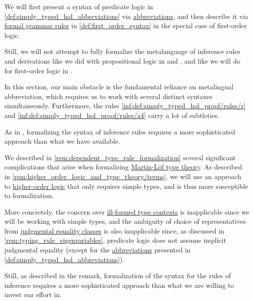 \begin{remark}\label{rem:predicate_logic_formalization}
  We will first present a syntax of predicate logic in \cref{def:simply_typed_hol_abbreviations} via \hyperref[con:metalingual_abbreviation]{abbreviations}, and then describe it via \hyperref[def:formal_grammar]{formal grammar rules} in \cref{def:first_order_syntax} in the special case of first-order logic.

  Still, we will not attempt to fully formalize the metalanguage of inference rules and derivations like we did with propositional logic in  and , and like we will do for first-order logic in .

  In this section, our main obstacle is the fundamental reliance on metalingual abbreviation, which requires us to work with several distinct syntaxes simultaneously. Furthermore, the rules \ref{inf:def:simply_typed_hol_proof/rules/r} and \ref{inf:def:simply_typed_hol_proof/rules/a4} carry a lot of subtleties.

  As in , formalizing the syntax of inference rules requires a more sophisticated approach than what we have available.
\end{remark}
\begin{comments}
  \item We described in \cref{rem:dependent_type_rule_formalization} several significant complications that arise when formalizing \hyperref[def:mltt]{Martin-L\"of type theory}. As described in \cref{rem:higher_order_logic_and_type_theory/terms}, we will use an approach to \hyperref[rem:predicate_logic]{higher-order logic} that only requires simple types, and is thus more susceptible to formalization.

  More concretely, the concern over \hyperref[rem:well_formed_contexts]{ill-formed type contexts} is inapplicable since we will be working with simple types, and the ambiguity of choice of representatives from \hyperref[con:equality]{judgmental equality classes} is also inapplicable since, as discussed in \cref{rem:typing_rule_eigenvariables}, predicate logic does not assume implicit judgmental equality (except for the \hyperref[con:metalingual_abbreviation]{abbreviations} presented in \cref{def:simply_typed_hol_abbreviations}).

  Still, as described in the remark, formalization of the syntax for the rules of inference requires a more sophisticated approach than what we are willing to invest our effort in.
\end{comments}

